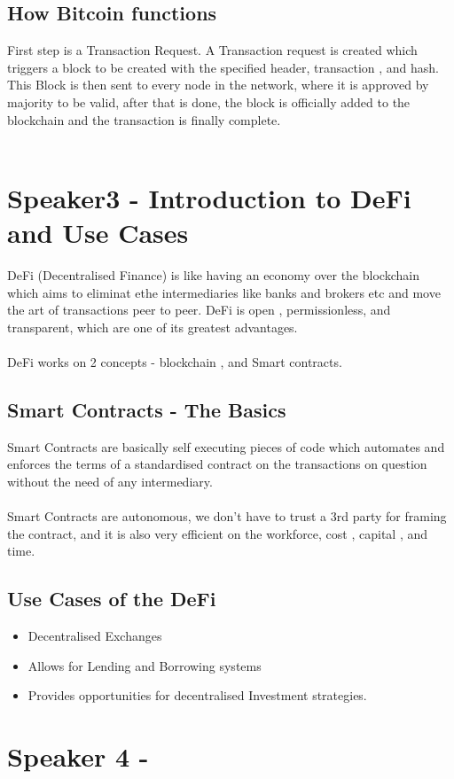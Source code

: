 \documentclass[a4paper,30pt]{report}
\begin{document}
      \section{How Bitcoin functions}
          First step is a Transaction Request. A Transaction request is created which triggers a block to be created with the specified header, transaction , and hash. This Block is then sent to every node in the network, where it is approved by majority to be valid, after that is done, the block is officially added to the blockchain and the transaction is finally complete.\\\\


  \chapter{Speaker3 - Introduction to DeFi and Use Cases}
      DeFi (Decentralised Finance) is like having an economy over the blockchain which aims to eliminat ethe intermediaries like banks and brokers etc and move the art of transactions peer to peer.
      DeFi is open , permissionless, and transparent, which are one of its greatest advantages.\\\\
      DeFi works on 2 concepts - blockchain , and Smart contracts.

      \section{Smart Contracts - The Basics}
          Smart Contracts are basically self executing pieces of code which automates and enforces the terms of a standardised contract on the transactions on question without the need of any intermediary.\\\\
          Smart Contracts are autonomous, we don't have to trust a 3rd party for framing the contract, and it is also very efficient on the workforce, cost , capital , and time.
      
      \section{Use Cases of the DeFi}
          \begin{itemize}
            \item Decentralised Exchanges
            \item Allows for Lending and Borrowing systems
            \item Provides opportunities for decentralised Investment strategies.
          \end{itemize}
  \chapter{Speaker 4 - }

  \chapter{}
\end{document}
